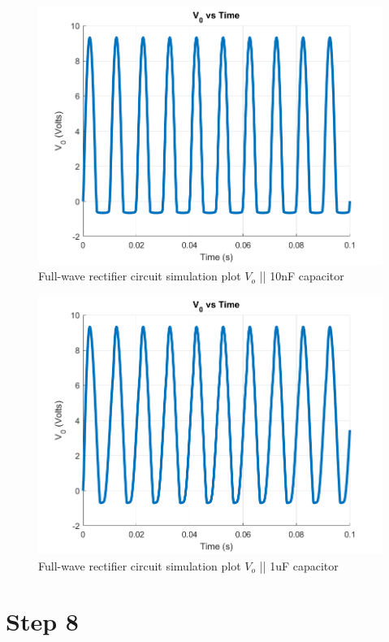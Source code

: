 \documentclass[letterpaper,12pt]{article}
\begin{document}
\begin{figure}[H]
    \centering
   \includegraphics[width=1\textwidth]{7_10nF.png}
   \caption{Full-wave rectifier circuit simulation plot \(V_o\) || 10nF capacitor}
\end{figure} 



\begin{figure}[H]
    \centering
   \includegraphics[width=1\textwidth]{7_1uF.png}
   \caption{Full-wave rectifier circuit simulation plot \(V_o\) || 1uF capacitor }
\end{figure} 




\section{Step 8}
\end{document}
